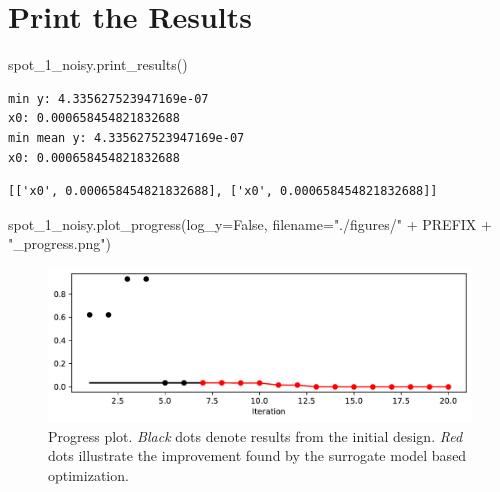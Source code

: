 \documentclass[
  letterpaper,
  DIV=11,
  numbers=noendperiod]{scrreprt}
\newenvironment{Shaded}{\begin{snugshade}}{\end{snugshade}}
\newcommand{\NormalTok}[1]{\textcolor[rgb]{0.00,0.23,0.31}{#1}}
\newcommand{\OperatorTok}[1]{\textcolor[rgb]{0.37,0.37,0.37}{#1}}
\newcommand{\StringTok}[1]{\textcolor[rgb]{0.13,0.47,0.30}{#1}}
\newcommand{\VariableTok}[1]{\textcolor[rgb]{0.07,0.07,0.07}{#1}}
\begin{document}
\section{Print the Results}\label{print-the-results-3}

\begin{Shaded}
\begin{Highlighting}[]
\NormalTok{spot\_1\_noisy.print\_results()}
\end{Highlighting}
\end{Shaded}

\begin{verbatim}
min y: 4.335627523947169e-07
x0: 0.000658454821832688
min mean y: 4.335627523947169e-07
x0: 0.000658454821832688
\end{verbatim}

\begin{verbatim}
[['x0', 0.000658454821832688], ['x0', 0.000658454821832688]]
\end{verbatim}

\begin{Shaded}
\begin{Highlighting}[]
\NormalTok{spot\_1\_noisy.plot\_progress(log\_y}\OperatorTok{=}\VariableTok{False}\NormalTok{,}
\NormalTok{    filename}\OperatorTok{=}\StringTok{"./figures/"} \OperatorTok{+}\NormalTok{ PREFIX }\OperatorTok{+} \StringTok{"\_progress.png"}\NormalTok{)}
\end{Highlighting}
\end{Shaded}

\begin{figure}[H]

{\centering \includegraphics{013_num_spot_noisy_files/figure-pdf/cell-12-output-1.pdf}

}

\caption{Progress plot. \emph{Black} dots denote results from the
initial design. \emph{Red} dots illustrate the improvement found by the
surrogate model based optimization.}

\end{figure}%
\end{document}
